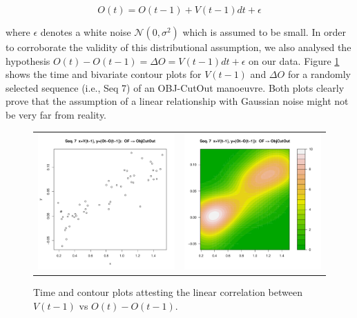 \begin{equation}
O(t) =O(t-1) +V(t-1)dt +\epsilon
\end{equation}

where $\epsilon$ denotes a white noise $\mathcal{N}(0,\sigma^2)$ which is assumed to be small. In order to corroborate the validity of this distributional assumption, we also analysed the hypothesis $O(t) - O(t-1) = \Delta O = V(t-1)dt +\epsilon$ on our data. Figure \ref{Figure:daimlerVvsOffs} shows the time and bivariate contour plots for $V(t-1)$ and $\Delta O$ for a randomly selected sequence (i.e., Seq 7) of an OBJ-CutOut manoeuvre. Both plots clearly prove that the assumption of a linear relationship with Gaussian noise might not be very far from reality.

\begin{figure}[ht!]
  \centering
  \setlength{\tabcolsep}{0.05pt}
  \renewcommand{\arraystretch}{0.02}
    \begin{tabular}{cc}
    \includegraphics[width=60mm]{figures/DaimlerOBJplotSerie7.pdf}&
    \includegraphics[width=60mm]{figures/DaimlerOBJcontourSerie7.pdf}\\
  \end{tabular}
      \caption{ \label{Figure:daimlerVvsOffs}Time and contour plots attesting the linear correlation between $V(t-1)$ vs $O(t) - O(t-1)$.}
\end{figure}

